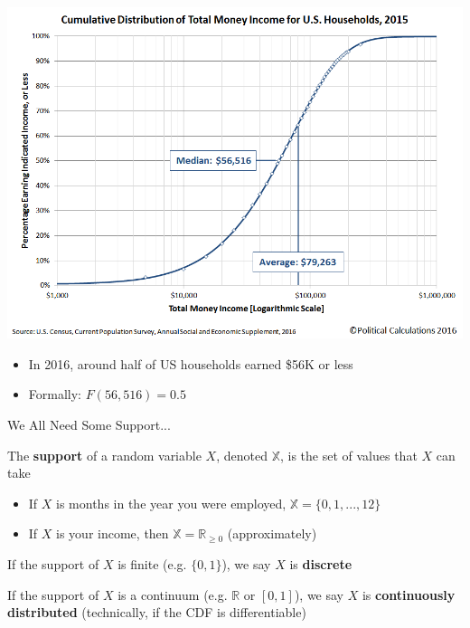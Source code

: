 \documentclass[11pt,english,handout]{beamer}
\newenvironment{wideitemize}{\itemize\addtolength{\itemsep}{10pt}}{\enditemize}
\begin{document}
\begin{frame}
	\centering
	\includegraphics[width = 0.8\linewidth]{cdf-income}
	
	\begin{itemize}
		\item
		In 2016, around half of US households earned \$56K or less\smallskip
\pause{}
		\item Formally: $F(56,516)=0.5$
	\end{itemize}
\end{frame}



\begin{frame}{We All Need Some Support...}
	
\begin{wideitemize}
	\item
	The \textbf{support} of a random variable $X$, denoted $\mathbb{X}$, is the set of values that $X$ can take
	
		\begin{itemize}
			\item 
			If $X$ is months in the year you were employed, $\mathbb{X} = \{0,1,...,12\}$
			
			\item
			If $X$ is your income, then $\mathbb{X} = \mathbb{R}_{\geq 0}$ (approximately)
		\end{itemize}
	\smallskip\pause{}

	\item
	If the support of $X$ is finite (e.g. $\{0,1\}$), we say $X$ is \textbf{discrete}
	
	\item
	If the support of $X$ is a continuum (e.g. $\mathbb{R}$ or $[0,1]$), we say $X$ is \textbf{continuously distributed}  (technically, if the CDF is differentiable)
\end{wideitemize}

\end{frame}
\end{document}
